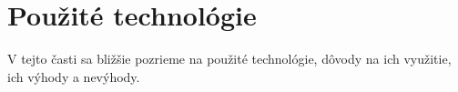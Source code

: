 \chapter{Pou\v{z}it\'{e} technol\'{o}gie}
\label{ch:tech}

V tejto časti sa bližšie pozrieme na použité technológie, dôvody na ich využitie,
ich výhody a nevýhody.
